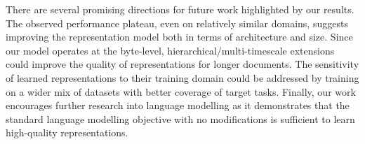 \documentclass{article}
\begin{document}
There are several promising directions for future work highlighted by our results. The observed performance plateau, even on relatively similar domains, suggests improving the representation model both in terms of architecture and size. Since our model operates at the byte-level, hierarchical/multi-timescale extensions could improve the quality of representations for longer documents. The sensitivity of learned representations to their training domain could be addressed by training on a wider mix of datasets with better coverage of target tasks. Finally, our work encourages further research into language modelling as it demonstrates that the standard language modelling objective with no modifications is sufficient to learn high-quality representations.



\end{document}
